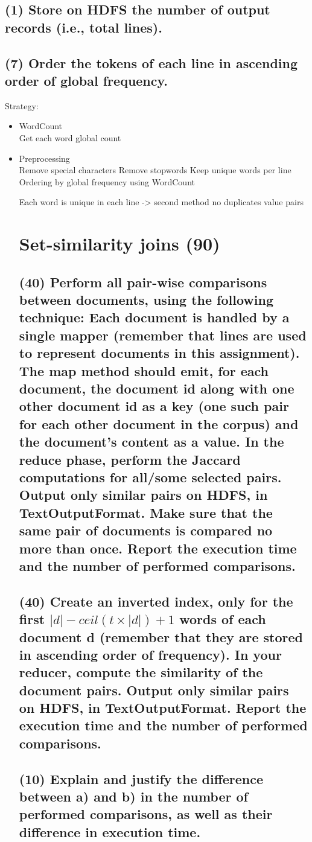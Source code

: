 \documentclass[a4paper,10pt]{article}
\begin{document}
\subsection{(1) Store on HDFS the number of output records (i.e., total lines).}

\subsection{(7) Order the tokens of each line in ascending order of global frequency.}


Strategy:
\begin{itemize}
  \item WordCount\\
    \subitem Get each word global count
  \item Preprocessing\\
    \subitem Remove special characters
    \subitem Remove stopwords
    \subitem Keep unique words per line
    \subitem Ordering by global frequency using WordCount

Each word is unique in each line -> second method no duplicates value pairs


\section{Set-similarity joins (90)}
\subsection{(40) Perform all pair-wise comparisons between documents, using the following
technique: Each document is handled by a single mapper (remember that lines are
used to represent documents in this assignment). The map method should emit, for
each document, the document id along with one other document id as a key (one such
pair for each other document in the corpus) and the document’s content as a value.
In the reduce phase, perform the Jaccard computations for all/some selected pairs.
Output only similar pairs on HDFS, in TextOutputFormat.
Make sure that the same pair of documents is compared no more than once. Report
the execution time and the number of performed comparisons.}

\subsection{(40) Create an inverted index, only for the first $|d| - ceil(t \times |d|) + 1$ words of each
document d (remember that they are stored in ascending order of frequency). In your
reducer, compute the similarity of the document pairs. Output only similar pairs on
HDFS, in TextOutputFormat. Report the execution time and the number of performed
comparisons.}

\subsection{(10) Explain and justify the difference between a) and b) in the number of performed
comparisons, as well as their difference in execution time.}

\end{itemize}
\end{document}
